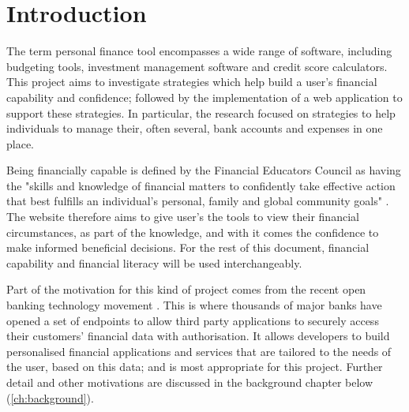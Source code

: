 \chapter{Introduction}
\label{ch:introduction}

The term personal finance tool encompasses a wide range of software, including budgeting tools, investment management software and credit score calculators. This project aims to investigate strategies which help build a user's financial capability and confidence; followed by the implementation of a web application to support these strategies. In particular, the research focused on strategies to help individuals to manage their, often several, bank accounts and expenses in one place.

Being financially capable is defined by the Financial Educators Council as having the "skills and knowledge of financial matters to confidently take effective action that best fulfills an individual's personal, family and global community goals" \cite{FinancialEducatorsCouncil}. The website therefore aims to give user's the tools to view their financial circumstances, as part of the knowledge, and with it comes the confidence to make informed beneficial decisions. For the rest of this document, financial capability and financial literacy will be used interchangeably.

Part of the motivation for this kind of project comes from the recent open banking technology movement \cite{OpenBanking}. This is where thousands of major banks have opened a set of endpoints to allow third party applications to securely access their customers' financial data with authorisation. It allows developers to build personalised financial applications and services that are tailored to the needs of the user, based on this data; and is most appropriate for this project. Further detail and other motivations are discussed in the background chapter below (\ref{ch:background}).






